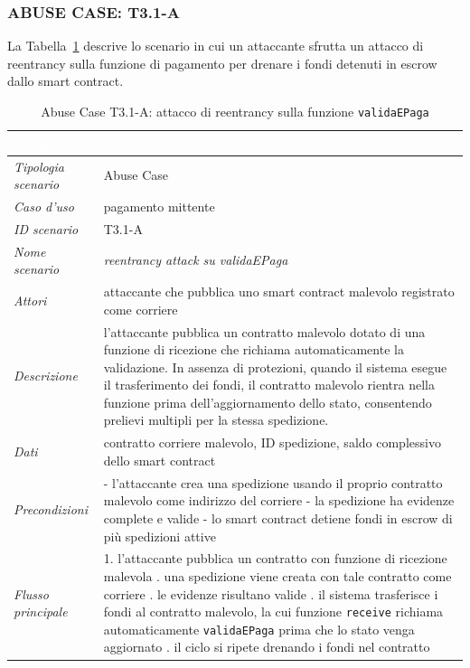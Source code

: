 \subsubsection*{ABUSE CASE: T3.1-A}
La Tabella~\ref{tab:t31a} descrive lo scenario in cui un attaccante sfrutta un attacco di reentrancy sulla funzione di pagamento per drenare i fondi detenuti in escrow dallo smart contract.
\begin{longtable}{| >{\columncolor{abuseCol}}p{} | p{} |}
\caption{Abuse Case T3.1-A: attacco di reentrancy sulla funzione \texttt{validaEPaga}}\label{tab:t31a}\\
\hline
\rowcolor{abuseHeader} \textcolor{white}{\textit{Campo}} & \textcolor{white}{\textit{Contenuto}} \\
\hline
\textit{Tipologia scenario} & Abuse Case \\
\hline
\textit{Caso d'uso} & pagamento mittente \\
\hline
\textit{ID scenario} & T3.1-A \\
\hline
\textit{Nome scenario} & \textit{reentrancy attack su validaEPaga} \\
\hline
\textit{Attori} & attaccante che pubblica uno smart contract malevolo registrato come corriere \\
\hline
\textit{Descrizione} & l'attaccante pubblica un contratto malevolo dotato di una funzione di ricezione che richiama automaticamente la validazione. In assenza di protezioni, quando il sistema esegue il trasferimento dei fondi, il contratto malevolo rientra nella funzione prima dell'aggiornamento dello stato, consentendo prelievi multipli per la stessa spedizione. \\
\hline
\textit{Dati} & contratto corriere malevolo, ID spedizione, saldo complessivo dello smart contract \\
\hline
\textit{Precondizioni} & - l'attaccante crea una spedizione usando il proprio contratto malevolo come indirizzo del corriere \newline - la spedizione ha evidenze complete e valide \newline - lo smart contract detiene fondi in escrow di più spedizioni attive \\
\hline
\textit{Flusso principale} & 1. l'attaccante pubblica un contratto con funzione di ricezione malevola \newline 2. una spedizione viene creata con tale contratto come corriere \newline 3. le evidenze risultano valide \newline 4. il sistema trasferisce i fondi al contratto malevolo, la cui funzione \texttt{receive} richiama automaticamente \texttt{validaEPaga} prima che lo stato venga aggiornato \newline 5. il ciclo si ripete drenando i fondi nel contratto \\

\end{longtable}
